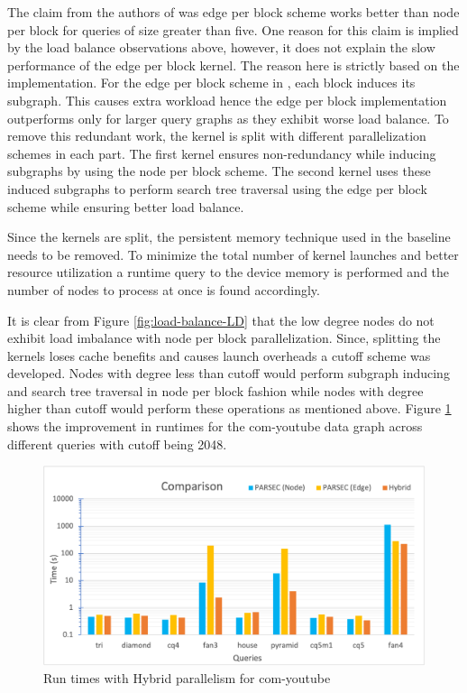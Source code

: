 {The claim from the authors of \cite{PARSEC_VD} was edge per block scheme works better than node per block for queries of size greater than five.
One reason for this claim is implied by the load balance observations above, however, it does not explain the slow performance of the edge per block kernel.
The reason here is strictly based on the implementation. For the edge per block scheme in \cite{PARSEC_VD}, each block induces its subgraph. This causes extra workload hence the edge per block implementation outperforms only for larger query graphs as they exhibit worse load balance.
To remove this redundant work, the kernel is split with different parallelization schemes in each part.
The first kernel ensures non-redundancy while inducing subgraphs by using the node per block scheme.
The second kernel uses these induced subgraphs to perform search tree traversal using the edge per block scheme while ensuring better load balance.

Since the kernels are split, the persistent memory technique used in the baseline \cite{PARSEC_VD} needs to be removed.
To minimize the total number of kernel launches and better resource utilization a runtime query to the device memory is performed and the number of nodes to process at once is found accordingly.

It is clear from Figure \ref{fig:load-balance-LD} that the low degree nodes do not exhibit load imbalance with node per block parallelization. Since, splitting the kernels loses cache benefits and causes launch overheads a cutoff scheme was developed. Nodes with degree less than cutoff would perform subgraph inducing and search tree traversal in node per block fashion while nodes with degree higher than cutoff would perform these operations as mentioned above.
Figure \ref{fig:hybrid-par-speedups} shows the improvement in runtimes for the com-youtube data graph across different queries with cutoff being 2048.

\begin{figure}
    \includegraphics[width=\textwidth]{fig/improvements/Hybrid-parallelism-speedups.png}
    \caption{Run times with Hybrid parallelism for com-youtube}
    \label{fig:hybrid-par-speedups}
\end{figure}

}

